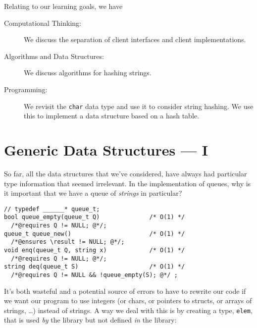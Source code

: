 \begin{gram}
Relating to our learning goals, we have
\begin{description}

\item[Computational Thinking:] We discuss the separation of client
  interfaces and client implementations.

\item[Algorithms and Data Structures:] We discuss algorithms for
  hashing strings.

\item[Programming:] We revisit the \lstinline'char' data type and use
  it to consider string hashing.  We use this to implement a data
  structure based on a hash table.
\end{description}
\end{gram}


\section{Generic Data Structures --- I}
\label{sec:hdict:genericity}

So far, all the data structures that we've considered, have always had
particular type information that seemed irrelevant. In the
implementation of queues, why is it important that we have a queue of
\emph{strings} in particular?
\begin{lstlisting}[language={[C0]C}]
// typedef ______* queue_t;
bool queue_empty(queue_t Q)              /* O(1) */
  /*@requires Q != NULL; @*/;
queue_t queue_new()                      /* O(1) */
  /*@ensures \result != NULL; @*/;
void enq(queue_t Q, string x)            /* O(1) */
  /*@requires Q != NULL; @*/;
string deq(queue_t S)                    /* O(1) */
  /*@requires Q != NULL && !queue_empty(S); @*/ ;
\end{lstlisting}
It's both wasteful and a potential source of errors to have to rewrite
our code if we want our program to use integers (or chars, or pointers
to structs, or arrays of strings, \ldots) instead of strings. A way we
deal with this is by creating a type, \lstinline'elem', that is used
\emph{by} the library but not defined \emph{in} the library:


